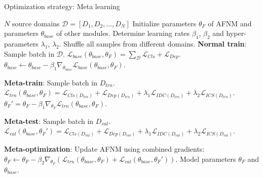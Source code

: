 \begin{frame}{Optimization strategy: Meta learning}
    \vspace{-0.5em}
    \begin{algorithm}[H]
        \caption{The optimization strategy of ANRL}
        \label{optimization_strategy}
        \scriptsize
        \begin{algorithmic}[1]
            \Require $N$ source domains $\mathcal{D} = [D_1,D_2,\dots,D_N]$
            \State Initialize parameters $\theta_{F}$ of AFNM and parameters $\theta_{base}$ of other modules.
            \State Determine learning rates $\beta_{1}$, $\beta_{2}$ and hyper-parameters $\lambda_1$, $\lambda_2$.
            \State Shuffle all samples from different domains.
                \State \textbf{Normal train}: Sample batch in $\mathcal{D}$.
                \State $\mathcal{L}_{base}(\theta_{base},\theta_{F}) = \sum_{\mathcal{D}} \mathcal{L}_{Cls} + \mathcal{L}_{Dep}$.
                \State $\theta_{base} \leftarrow \theta_{base} - \beta_1 \nabla_{\theta_{base}} \mathcal{L}_{base}(\theta_{base},\theta_{F})$.
                
                \State \textbf{Meta-train}: Sample batch in $D_{trn}$.
                \State $\mathcal{L}_{trn}(\theta_{base},\theta_{F}) = \mathcal{L}_{Cls(D_{trn})} + \mathcal{L}_{Dep(D_{trn})} + \lambda_1 \mathcal{L}_{IDC(D_{trn})} + \lambda_2 \mathcal{L}_{ICS(D_{trn})}$.
                \State $\theta_{F}' = \theta_{F} - \beta_1 \nabla_{\theta_{F}} \mathcal{L}_{trn}(\theta_{base},\theta_{F})$.
                
                \State \textbf{Meta-test}: Sample batch in $D_{val}$.
                \State $\mathcal{L}_{val}(\theta_{base},\theta_{F}') = \mathcal{L}_{Cls(D_{val})} + \mathcal{L}_{Dep(D_{val})} + \lambda_1 \mathcal{L}_{IDC(D_{val})} + \lambda_2 \mathcal{L}_{ICS(D_{val})}$.
                
                \State \textbf{Meta-optimization}: Update AFNM using combined gradients:
                \State $\theta_{F} \leftarrow \theta_{F} - \beta_2 \nabla_{\theta_{F}} (\mathcal{L}_{trn}(\theta_{base},\theta_{F}) + \mathcal{L}_{val}(\theta_{base},\theta_{F}'))$.
            \EndFor
            \State \Return Model parameters $\theta_{F}$ and $\theta_{base}$.
        \end{algorithmic}
    \end{algorithm}
\end{frame}
